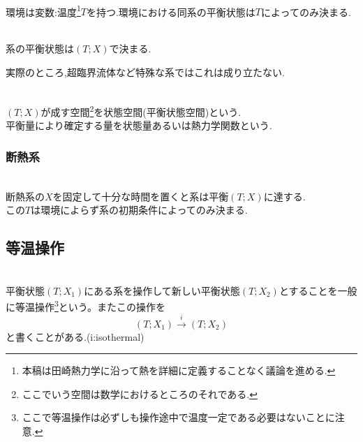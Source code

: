 \documentclass[dvipdfmx,uplatex]{jsarticle}
\begin{document}
\begin{law} \mbox{} \\
環境は変数:温度\footnote{
本稿は田崎熱力学に沿って熱を詳細に定義することなく議論を進める.
	}$T$を持つ.環境における同系の平衡状態は$T$によってのみ決まる.
\end{law}

\begin{theo} \mbox{} \\
系の平衡状態は$(T;X)$で決まる.
\end{theo}
実際のところ,超臨界流体など特殊な系ではこれは成り立たない.

\begin{defi} \mbox{} \\
$(T;X)$が成す空間\footnote{
ここでいう空間は数学におけるところのそれである.
	}を状態空間(平衡状態空間)という. \\
平衡量により確定する量を状態量あるいは熱力学関数という.
\end{defi}

\subsubsection{断熱系}
\begin{law} \mbox{} \\
断熱系の$X$を固定して十分な時間を置くと系は平衡$(T;X)$に達する. \\
この$T$は環境によらず系の初期条件によってのみ決まる.
\end{law}

\subsection{等温操作}

\begin{defi} \mbox{} \\
平衡状態$(T;X_1)$にある系を操作して新しい平衡状態$(T;X_2)$とすることを一般に等温操作\footnote{
ここで等温操作は必ずしも操作途中で温度一定である必要はないことに注意.
	}という。またこの操作を
\[
(T;X_1) \xrightarrow{i} (T;X_2)
\]
と書くことがある.(i:isothermal)
\end{defi}
\end{document}
